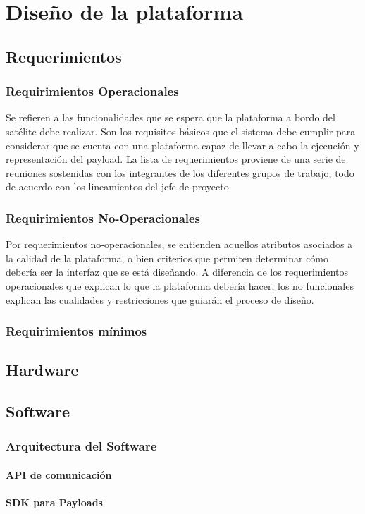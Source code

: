 \chapter{Diseño de la plataforma}


\section{Requerimientos}
\subsection{Requirimientos Operacionales}
Se refieren a las funcionalidades que se espera que la plataforma a bordo del satélite debe realizar. Son los requisitos básicos que el sistema debe cumplir para considerar
que se cuenta con una plataforma capaz de llevar a cabo la ejecución y representación del payload. La lista de requerimientos
proviene de una serie de reuniones sostenidas con los integrantes de los diferentes grupos de
trabajo, todo de acuerdo con los lineamientos del jefe de proyecto.

\subsection{Requirimientos No-Operacionales}
Por requerimientos no-operacionales, se entienden aquellos atributos asociados a la calidad de la plataforma, o bien criterios que permiten determinar cómo debería ser la interfaz que se está diseñando. A diferencia de los requerimientos operacionales que explican lo que la plataforma debería hacer, los no funcionales explican las cualidades y restricciones que guiarán el proceso de diseño.

\subsection{Requirimientos mínimos}

\section{Hardware}
\section{Software}
\subsection{Arquitectura del Software}
\subsubsection{API de comunicación}
\subsubsection{SDK para Payloads}
